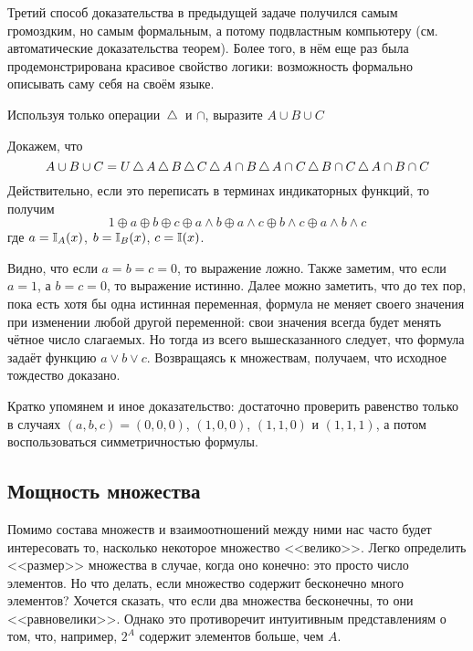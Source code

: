 Третий способ доказательства в предыдущей задаче получился самым громоздким, но самым формальным,
а потому подвластным компьютеру (см. автоматические доказательства теорем).
Более того, в нём еще раз была продемонстрирована красивое свойство логики:
возможность формально описывать саму себя на своём языке.

\begin{Exercise}[counter=SecExercise]
    \noindent
    Используя только операции $ \,\triangle\, $ и $ \cap $, выразите $ A \cup B \cup C $
\end{Exercise}

\begin{Answer}
    \noindent
    Докажем, что
    \[
        A \cup B \cup C = U \,\triangle\, A \,\triangle\, B \,\triangle\, C \,\triangle\, A \cap B \,\triangle\, A \cap C \,\triangle\, B \cap C \,\triangle\, A \cap B \cap C
    \]
    Действительно, если это переписать в терминах индикаторных функций, то получим
    \[
        1 \oplus a \oplus b \oplus c \oplus a \wedge b \oplus a \wedge c \oplus b \wedge c \oplus a \wedge b \wedge c
    \]
    где $ a = \mathbb{I}_A(x) $, $ b = \mathbb{I}_B(x) $, $ c = \mathbb{I}(x) $.

    Видно, что если $ a = b = c = 0 $, то выражение ложно.
    Также заметим, что если $ a = 1 $, а $ b = c = 0 $, то выражение истинно.
    Далее можно заметить, что до тех пор, пока есть хотя бы одна истинная переменная, формула не меняет своего значения при изменении любой другой переменной:
    свои значения всегда будет менять чётное число слагаемых.
    Но тогда из всего вышесказанного следует, что формула задаёт функцию $ a \vee b \vee c $.
    Возвращаясь к множествам, получаем, что исходное тождество доказано.

    Кратко упомянем и иное доказательство: достаточно проверить равенство только в случаях $ (a,b,c) = (0,0,0) $, $ (1,0,0) $, $ (1,1,0) $ и $ (1,1,1) $, а потом воспользоваться симметричностью формулы.
\end{Answer}


\iffalse
\subsection{Мощность множества}
\label{subsec:sets:cardinality}

Помимо состава множеств и взаимоотношений между ними нас часто будет интересовать то, насколько некоторое множество <<велико>>.
Легко определить <<размер>> множества в случае, когда оно конечно: это просто число элементов.
Но что делать, если множество содержит бесконечно много элементов?
Хочется сказать, что если два множества бесконечны, то они <<равновелики>>.
Однако это противоречит интуитивным представлениям о том, что, например, $ 2^A $ содержит элементов больше, чем $ A $.

